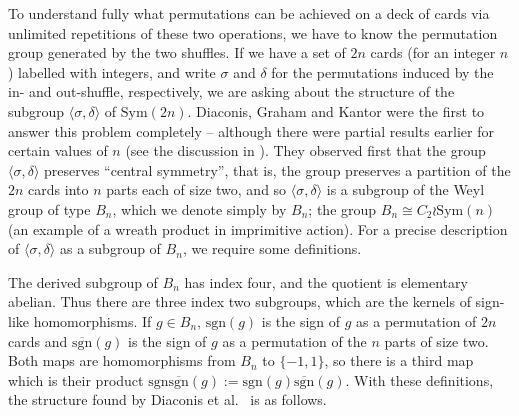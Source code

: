 \documentclass[12pt]{amsart}
\theoremstyle{remark}
\theoremstyle{definition}
\newcommand{\sym}{\mathrm{Sym}}
\begin{document}
To understand fully what permutations can be achieved on a deck of cards via unlimited repetitions of these two operations, we have to know the permutation group generated by the two shuffles. If we have a set of $2n$ cards (for an integer $n$) labelled with integers, and write $\sigma$ and $\delta$ for the permutations induced by the in- and out-shuffle, respectively, we are asking about the structure of the subgroup $\langle \sigma ,\delta \rangle$  of $\sym(2n)$. Diaconis, Graham and Kantor \cite{DGK} were the first to answer this problem completely -- although there were partial results earlier for certain values of $n$ (see the discussion in \cite[\S3]{DGK}).
They observed first that the group $\langle \sigma , \delta \rangle$ preserves ``central symmetry'', that is, the group preserves a partition of the $2n$ cards into $n$ parts each of size two, and so $\langle \sigma , \delta \rangle$ is a subgroup of the Weyl group of type $B_n$, which we denote simply by $B_n$; the group $B_n\cong C_2 \wr \sym(n)$ (an example of a wreath product in imprimitive action).  For a precise description of $\langle \sigma, \delta \rangle$  as a subgroup of $B_n$, we require some definitions.




The derived subgroup of $B_n$ has index four, and the quotient is elementary abelian. Thus there are three index two subgroups, which are the kernels of sign-like homomorphisms. If $g\in B_n$, $\mathrm{sgn}(g)$ is the sign of $g$ as a permutation of $2n$ cards and $\overline{\mathrm{sgn}}(g) $ is the sign of $g$ as a permutation of the $n$ parts of size two. Both maps are homomorphisms from $B_n$ to $\{-1,1\}$, so there is a third map which is their product $\mathrm{sgn}\overline{\mathrm{sgn}}(g):=\mathrm{sgn}(g)\overline{\mathrm{sgn}}(g)$.
With these definitions, the structure found by Diaconis et al.~ is as follows.
\end{document}
